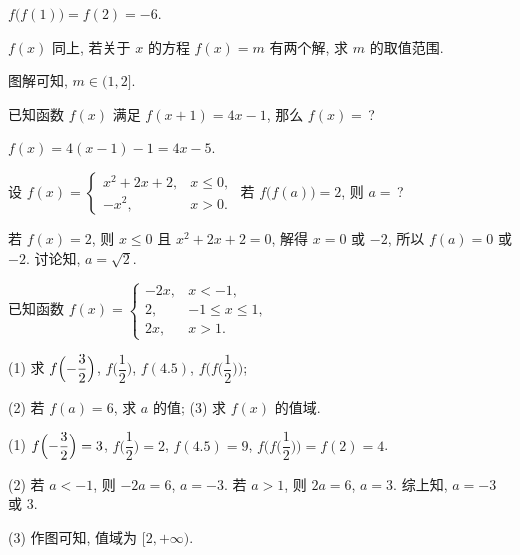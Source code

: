   \beginsolution
    $f\big(f(1)\big)=f(2)=-6$.
    
    \varexercise $f(x)$ 同上, 若关于 $x$ 的方程 $f(x)=m$ 有两个解, 求 $m$ 的取值范围.
    
    图解可知, $m\in(1,2]$. 
  \endsolution
  
  \begin{exercise}
    已知函数 $f(x)$ 满足 $f(x+1)=4x-1$, 那么 $f(x)=$\,?
  \end{exercise}

  \beginsolution
    $f(x)=4(x-1)-1=4x-5$.
  \endsolution
  
  \begin{exercise}
    设 $f(x)=\begin{cases}
      x^2+2x+2, & x\leqslant 0,\\
      -x^2, & x>0.
    \end{cases}$ 若 $f\big(f(a)\big)=2$, 则 $a=$\,?
  \end{exercise}

  \beginsolution
    若 $f(x)=2$, 则 $x\leqslant 0$ 且 $x^2+2x+2=0$, 解得 $x=0$ 或 $-2$, 所以 $f(a)=0$ 或 $-2$. 讨论知, $a=\sqrt2$.
  \endsolution
  
  \begin{exercise}
    已知函数 $f(x)=\begin{cases}
      -2x, & x<-1,\\
      2, & -1\leqslant x\leqslant 1,\\
      2x, & x>1.\end{cases}$

    (1) 求 $f\Bigl(-\dfrac32\Bigr)$, $f\Big(\dfrac12\Big)$, 
        $f(4.5)$, $f\Big(f\Big(\dfrac12\Big)\Big)$;
        
    (2) 若 $f(a)=6$, 求 $a$ 的值;\qquad
    (3) 求 $f(x)$ 的值域.
  \end{exercise}

  \beginsolution
    (1) $f\Bigl(-\dfrac32\Bigr)=3$, $f\Big(\dfrac12\Big)=2$, 
      $f(4.5)=9$, $f\Big(f\Big(\dfrac12\Big)\Big)=f(2)=4$.
      
    (2) 若 $a<-1$, 则 $-2a=6$, $a=-3$. 若 $a>1$, 则 $2a=6$, $a=3$. 综上知, $a=-3$ 或 $3$.
    
    (3) 作图可知, 值域为 $[2,+\infty)$.
  \endsolution
  
